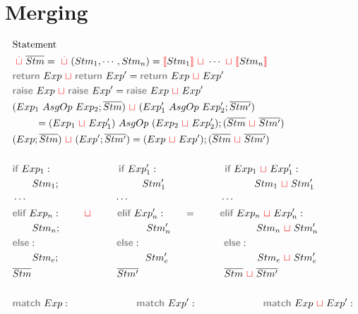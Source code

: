 \documentclass{thesis}
\newcommand{\gray}[1]{\textbf{\textsf{\color{Gray}#1}}}
\newcommand{\nl}[1]{{\color{red}{\llbracket}}#1{\color{red}{\rrbracket}}} %
\newcommand{\mg}{~{\color{red}{\sqcup}}~} %
\begin{document}
\section*{Merging}
\begin{align*}
  & \text{Statement}\\
  & \overset{\color{red}.}{\mg} \overline{Stm} = \overset{\color{red}.}{\mg}(Stm_1, \cdots ,Stm_n) = \nl{Stm_1} \mg \cdots \mg \nl{Stm_n}\\
  & \gray{return}~Exp \mg \gray{return}~Exp' = \gray{return}~Exp \mg Exp'\\
  & \gray{raise}~ Exp \mg \gray{raise}~ Exp' = \gray{raise}~ Exp \mg Exp'\\
  & (Exp_1 ~AsgOp~ Exp_2 ; \overline{Stm}) \mg (Exp'_1 ~AsgOp~ Exp'_2 ; \overline{Stm'})\\
  & ~~~~~~~ = (Exp_1 \mg Exp'_1) ~AsgOp~ (Exp_2 \mg Exp'_2) ; (\overline{Stm} \mg \overline{Stm'})\\
  & (Exp ; \overline{Stm}) \mg (Exp' ; \overline{Stm'}) = (Exp \mg Exp') ; (\overline{Stm} \mg \overline{Stm'})\\
  \\
  & \gray{if}~Exp_1: ~~~~~~~~~~~~~~~~~~~~\gray{if}~Exp'_1: ~~~~~~~~~~~~~~~~~~~~\gray{if}~Exp_1 \mg Exp'_1:\\
  & ~~~~~~Stm_1; ~~~~~~~~~~~~~~~~~~~~~~~~~ Stm'_1 ~~~~~~~~~~~~~~~~~~~~~~~~~~~ Stm_1 \mg Stm'_1\\
  & \cdots ~~~~~~~~~~~~~~~~~~~~~~~~~~~\cdots ~~~~~~~~~~~~~~~~~~~~~~~~~~~~\cdots\\
  & \gray{elif}~Exp_n: ~~~~~~\mg~~~~~~~\gray{elif}~Exp'_n: ~~~~~~~=~~~~~~~\gray{elif}~Exp_n \mg Exp'_n:\\
  & ~~~~~~Stm_n; ~~~~~~~~~~~~~~~~~~~~~~~~~~ Stm'_n ~~~~~~~~~~~~~~~~~~~~~~~~~~ Stm_n \mg Stm'_n\\
  & \gray{else}:~~~~~~~~~~~~~~~~~~~~~~~~\gray{else}:~~~~~~~~~~~~~~~~~~~~~~~~~\gray{else}:~\\
  & ~~~~~~Stm_e; ~~~~~~~~~~~~~~~~~~~~~~~~~~ Stm'_e ~~~~~~~~~~~~~~~~~~~~~~~~~~~ Stm_e \mg Stm'_e\\
  & \overline{Stm} ~~~~~~~~~~~~~~~~~~~~~~~~~~ \overline{Stm'} ~~~~~~~~~~~~~~~~~~~~~~~~~~ \overline{Stm} \mg \overline{Stm'}\\
  \\
  & \gray{match}~Exp: ~~~~~~~~~~~~~~~~~~~~\gray{match}~Exp': ~~~~~~~~~~~~~~~~~~~~\gray{match}~Exp \mg Exp':\\

\end{align*}
\end{document}
